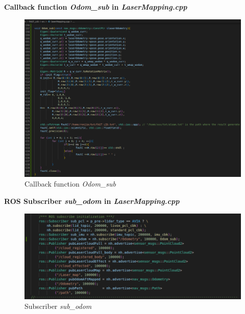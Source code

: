 \documentclass[hyperref]{article}
\theoremstyle{nonumberplain}
\begin{document}
\begin{appendices}
	\newpage

	\textbf{\textcolor[rgb]{0.98,0.00,0.00}{Callback function \textit{Odom\_sub} in \textit{LaserMapping.cpp}}}
	
	\begin{figure}[H]
		\centering
		\includegraphics[width=18cm]{bonus_savedatafunction.png}
		\caption{Callback function \textit{Odom\_sub}}
		\label{fig12}
	\end{figure} 
	
	\textbf{\textcolor[rgb]{0.98,0.00,0.00}{ROS Subscriber \textit{sub\_odom} in \textit{LaserMapping.cpp}}}
	
	\begin{figure}[H]
		\centering
		\includegraphics[width=18cm]{bonus_publisherset.png}
		\caption{Subscriber \textit{sub\_odom}}
		\label{fig13}
	\end{figure} 
	

	
\end{appendices}



%	
%	





	
\end{document}
